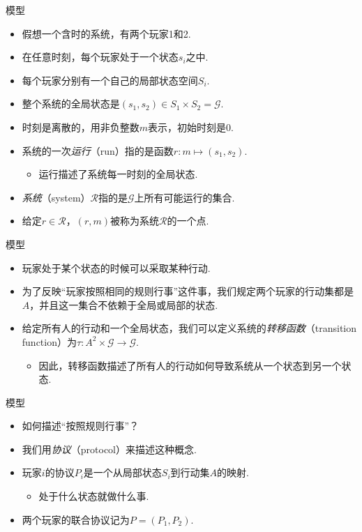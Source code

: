 {模型}
\begin{itemize}
    \item 假想一个含时的系统，有两个玩家1和2.
    \item 在任意时刻，每个玩家处于一个状态$s_i$之中.
    \item 每个玩家分别有一个自己的局部状态空间$S_i$.
    \item 整个系统的全局状态是$(s_1,s_2)\in S_1\times S_2=\mathcal G$.
    \item 时刻是离散的，用非负整数$m$表示，初始时刻是$0$.
    \item 系统的一次\emph{运行}（run）指的是函数$r:m\mapsto(s_1,s_2)$.
    \begin{itemize}
        \item 运行描述了系统每一时刻的全局状态.
    \end{itemize}
    \item \emph{系统}（system）$\mathcal R$指的是$\mathcal G$上所有可能运行的集合.
    \item 给定$r\in\mathcal R$，$(r,m)$被称为系统$\mathcal R$的一个点.
\end{itemize}


{模型}
\begin{itemize}
    \item 玩家处于某个状态的时候可以采取某种行动.
    \item 为了反映“玩家按照相同的规则行事”这件事，我们规定两个玩家的行动集都是$A$，并且这一集合不依赖于全局或局部的状态.
    \item 给定所有人的行动和一个全局状态，我们可以定义系统的\emph{转移函数}（transition function）为$\tau:A^2\times\mathcal G\to\mathcal G$.
    \begin{itemize}
        \item 因此，转移函数描述了所有人的行动如何导致系统从一个状态到另一个状态.
    \end{itemize}
\end{itemize}


{模型}
\begin{itemize}
    \item 如何描述“按照规则行事”？
    \item 我们用\emph{协议}（protocol）来描述这种概念.
    \item 玩家$i$的协议$P_i$是一个从局部状态$S_i$到行动集$A$的映射.
    \begin{itemize}
        \item 处于什么状态就做什么事.
    \end{itemize}
    \item 两个玩家的联合协议记为$P=(P_1,P_2)$.
\end{itemize}


